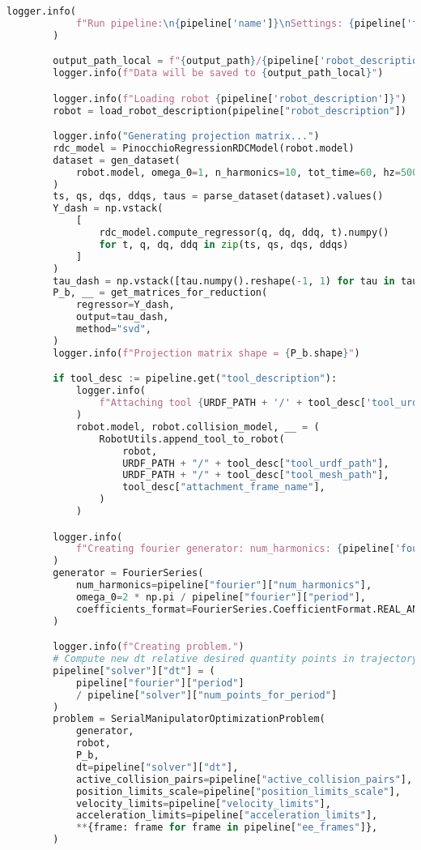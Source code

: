 \begin{lstlisting}[language=python, caption=\raggedright{generation/gen\_trajectory\_fourier.py}, frame=single]
        logger.info(
            f"Run pipeline:\n{pipeline['name']}\nSettings: {pipeline['fourier']}"
        )

        output_path_local = f"{output_path}/{pipeline['robot_description']}/"
        logger.info(f"Data will be saved to {output_path_local}")

        logger.info(f"Loading robot {pipeline['robot_description']}")
        robot = load_robot_description(pipeline["robot_description"])

        logger.info("Generating projection matrix...")
        rdc_model = PinocchioRegressionRDCModel(robot.model)
        dataset = gen_dataset(
            robot.model, omega_0=1, n_harmonics=10, tot_time=60, hz=500
        )
        ts, qs, dqs, ddqs, taus = parse_dataset(dataset).values()
        Y_dash = np.vstack(
            [
                rdc_model.compute_regressor(q, dq, ddq, t).numpy()
                for t, q, dq, ddq in zip(ts, qs, dqs, ddqs)
            ]
        )
        tau_dash = np.vstack([tau.numpy().reshape(-1, 1) for tau in taus])
        P_b, __ = get_matrices_for_reduction(
            regressor=Y_dash,
            output=tau_dash,
            method="svd",
        )
        logger.info(f"Projection matrix shape = {P_b.shape}")

        if tool_desc := pipeline.get("tool_description"):
            logger.info(
                f"Attaching tool {URDF_PATH + '/' + tool_desc['tool_urdf_path']}"
            )
            robot.model, robot.collision_model, __ = (
                RobotUtils.append_tool_to_robot(
                    robot,
                    URDF_PATH + "/" + tool_desc["tool_urdf_path"],
                    URDF_PATH + "/" + tool_desc["tool_mesh_path"],
                    tool_desc["attachment_frame_name"],
                )
            )

        logger.info(
            f"Creating fourier generator: num_harmonics: {pipeline['fourier']['num_harmonics']}, omega_0: {2 * np.pi / pipeline['fourier']['period']}"
        )
        generator = FourierSeries(
            num_harmonics=pipeline["fourier"]["num_harmonics"],
            omega_0=2 * np.pi / pipeline["fourier"]["period"],
            coefficients_format=FourierSeries.CoefficientFormat.REAL_AND_IMAGINARY,
        )

        logger.info(f"Creating problem.")
        # Compute new dt relative desired quantity points in trajectory
        pipeline["solver"]["dt"] = (
            pipeline["fourier"]["period"]
            / pipeline["solver"]["num_points_for_period"]
        )
        problem = SerialManipulatorOptimizationProblem(
            generator,
            robot,
            P_b,
            dt=pipeline["solver"]["dt"],
            active_collision_pairs=pipeline["active_collision_pairs"],
            position_limits_scale=pipeline["position_limits_scale"],
            velocity_limits=pipeline["velocity_limits"],
            acceleration_limits=pipeline["acceleration_limits"],
            **{frame: frame for frame in pipeline["ee_frames"]},
        )


\end{lstlisting}
